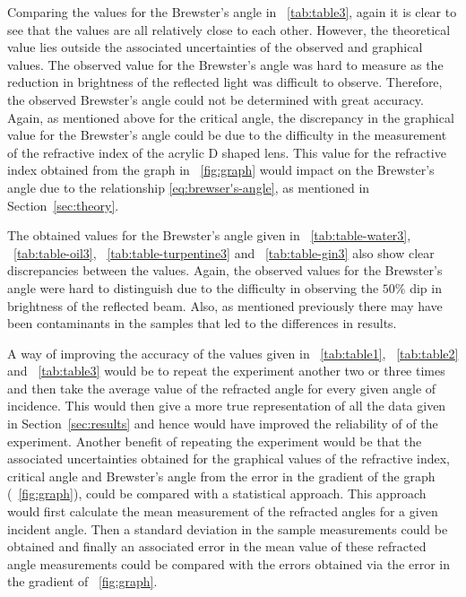 \documentclass{article}
\newcommand{\figref}[2][\figurename~]{#1\ref{#2}}
\newcommand{\tabref}[2][\tablename~]{#1\ref{#2}}
\newcommand{\secref}[2][Section~]{#1\ref{#2}}
\begin{document}
\vspace{2mm}
\noindent
Comparing the values for the Brewster's angle in \tabref{tab:table3}, again it is clear to see that the values are all relatively close to each other. However, the theoretical value lies outside the associated uncertainties of the observed and graphical values. The observed value for the Brewster's angle was hard to measure as the reduction in brightness of the reflected light was difficult to observe. Therefore, the observed Brewster's angle could not be determined with great accuracy. Again, as mentioned above for the critical angle, the discrepancy in the  graphical value for the Brewster's angle could be due to the difficulty in the measurement of the refractive index of the acrylic D shaped lens. This value for the refractive index obtained from the graph in \figref{fig:graph} would impact on the Brewster's angle due to the relationship \eqref{eq:brewser's-angle}, as mentioned in \secref{sec:theory}.

\vspace{2mm}
\noindent
The obtained values for the Brewster's angle given in \tabref{tab:table-water3}, \tabref{tab:table-oil3}, \tabref{tab:table-turpentine3} and \tabref{tab:table-gin3} also show clear discrepancies between the values. Again, the observed values for the Brewster's angle were hard to distinguish due to the difficulty in observing the $50\%$ dip in brightness of the reflected beam. Also, as mentioned previously there may have been contaminants in the samples that led to the differences in results.

\vspace{2mm}
\noindent
A way of improving the accuracy of the values given in \tabref{tab:table1}, \tabref{tab:table2} and \tabref{tab:table3} would be to repeat the experiment another two or three times and then take the average value of the refracted angle for every given angle of incidence. This would then give a more true representation of all the data given in \secref{sec:results} and hence would have improved the reliability of of the experiment. Another benefit of repeating the experiment would be that the associated uncertainties obtained for the graphical values of the refractive index, critical angle and Brewster's angle from the error in the gradient of the graph (\figref{fig:graph}), could be compared with a statistical approach. This approach would first calculate the mean measurement of the refracted angles for a given incident angle. Then a standard deviation in the sample measurements could be obtained and finally an associated error in the mean value of these refracted angle measurements could be compared with the errors obtained via the error in the gradient of \figref{fig:graph}. 
\end{document}
